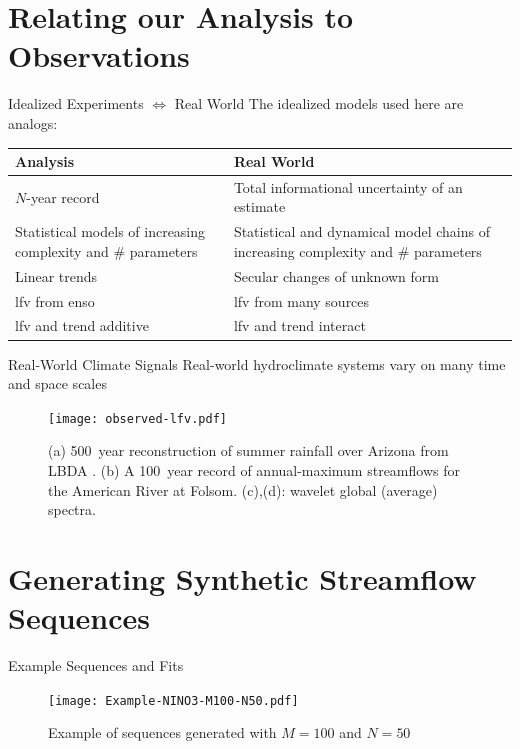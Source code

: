 \documentclass[
  10pt,     %
  handout   %
]{beamer}
\begin{document}
\section{Relating our Analysis to Observations}

\begin{frame}{Idealized Experiments $\iff$ Real World}
  The idealized models used here are analogs:
  \begin{table}
    \centering
    \begin{tabular}{L{0.425\textwidth}L{0.525\textwidth}}
      \toprule
      Analysis & Real World \\\midrule
      $N$-year record & Total informational uncertainty of an estimate \\\midrule
      Statistical models of increasing complexity and \# parameters & Statistical and dynamical model chains of increasing complexity and \# parameters \\\midrule
      Linear trends & Secular changes of unknown form \\\midrule
      \gls{lfv} from \gls{enso} & \gls{lfv} from many sources \\\midrule
      \gls{lfv} and trend additive & \gls{lfv} and trend interact \\
      \bottomrule
    \end{tabular}
  \end{table}
\end{frame}

\begin{frame}{Real-World Climate Signals}
  Real-world hydroclimate systems vary on many time and space scales
  \begin{figure}
    \centering
    \texttt{[image: observed-lfv.pdf]}
    \caption{
      (a) \SI{500}{year} reconstruction of summer rainfall over Arizona from LBDA \citep{Cook:2010bz}.
      (b) A \SI{100}{year} record of annual-maximum streamflows for the American River at Folsom.
      (c),(d): wavelet global (average) spectra.
    }\label{fig:observed-lfv}
  \end{figure}
\end{frame}

\section{Generating Synthetic Streamflow Sequences}

\begin{frame}{Example Sequences and Fits}
  \begin{figure}
    \texttt{[image: Example-NINO3-M100-N50.pdf]}
    \caption{Example of sequences generated with $M=100$ and $N=50$}
  \end{figure}
\end{frame}
\end{document}
